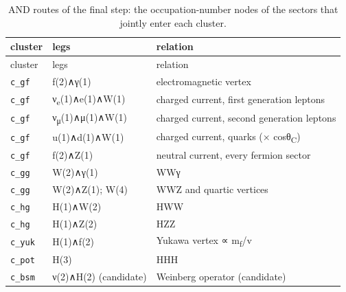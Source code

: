 \begin{longtable}{@{}>{\raggedright\arraybackslash}p{3.2cm}>{\raggedright\arraybackslash}p{3.6cm}>{\raggedright\arraybackslash}p{7.2cm}@{}}
\caption{AND routes of the final step: the occupation-number nodes of the sectors that jointly enter each cluster.}\label{tab:routes}\\
\toprule cluster & legs & relation\\\midrule\endfirsthead
\toprule cluster & legs & relation\\\midrule\endhead
\bottomrule\endfoot
\texttt{c\_gf} & f(2)∧γ(1) & electromagnetic vertex\\
\texttt{c\_gf} & ν\textsubscript{e}(1)∧e(1)∧W(1) & charged current, first generation leptons\\
\texttt{c\_gf} & ν\textsubscript{μ}(1)∧μ(1)∧W(1) & charged current, second generation leptons\\
\texttt{c\_gf} & u(1)∧d(1)∧W(1) & charged current, quarks (× cosθ\textsubscript{C})\\
\texttt{c\_gf} & f(2)∧Z(1) & neutral current, every fermion sector\\
\texttt{c\_gg} & W(2)∧γ(1) & WWγ\\
\texttt{c\_gg} & W(2)∧Z(1); W(4) & WWZ and quartic vertices\\
\texttt{c\_hg} & H(1)∧W(2) & HWW\\
\texttt{c\_hg} & H(1)∧Z(2) & HZZ\\
\texttt{c\_yuk} & H(1)∧f(2) & Yukawa vertex ∝ m\textsubscript{f}/v\\
\texttt{c\_pot} & H(3) & HHH\\
\texttt{c\_bsm} & ν(2)∧H(2) (candidate) & Weinberg operator (candidate)\\
\end{longtable}
